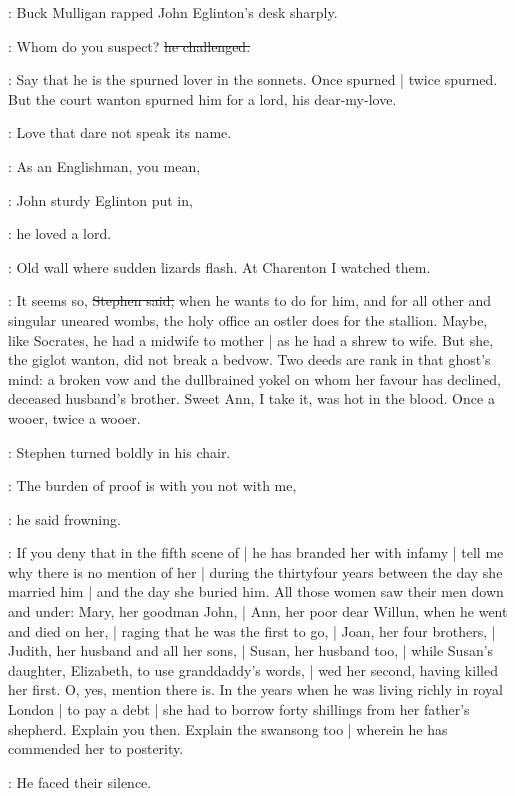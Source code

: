 :
Buck Mulligan rapped John Eglinton's desk sharply.

\mulligan:
Whom do you suspect?
\sout{he challenged.}

\Stephen:
Say that he is the spurned lover in the sonnets.
Once spurned |
twice spurned.
But the court wanton spurned him for a lord,
his dear-my-love.

\StephenInt:
Love that dare not speak its name.

\eglinton:
As an Englishman,
you mean,

:
John sturdy Eglinton put in,

\eglinton:
he loved a lord.

\StephenInt:
Old wall where sudden lizards flash.
At Charenton I watched them.

\Stephen:
It seems so,
\sout{Stephen said,}
when he wants to do for him,
and for all other and singular uneared wombs,
the holy office an ostler does for the stallion.
Maybe,
like Socrates,
he had a midwife to mother |
as he had a shrew to wife.
But she,
the giglot wanton,
did not break a bedvow.
Two deeds are rank in that ghost's mind:
a broken vow and the dullbrained yokel on whom her favour has declined,
deceased husband's brother.
Sweet Ann,
I take it,
was hot in the blood.
Once a wooer,
twice a wooer.

:
Stephen turned boldly in his chair.

\Stephen:
The burden of proof is with you not with me,

:
he said frowning.

\Stephen:
If you deny that in the fifth scene of  |
he has branded her with infamy |
tell me why there is no mention of her |
during the thirtyfour years between the day she married him |
and the day she buried him.
All those women saw their men down and under:
Mary, her goodman John, |
Ann, her poor dear Willun, when he went and died on her, |
raging that he was the first to go, |
Joan, her four brothers, |
Judith, her husband and all her sons, |
Susan, her husband too, |
while Susan's daughter,
Elizabeth,
to use granddaddy's words, |
wed her second,
having killed her first.
O, yes,
mention there is.
In the years when he was living richly in royal London |
to pay a debt |
she had to borrow forty shillings from her father's shepherd.
Explain you then.
Explain the swansong too |
wherein he has commended her to posterity.

:
He faced their silence.

